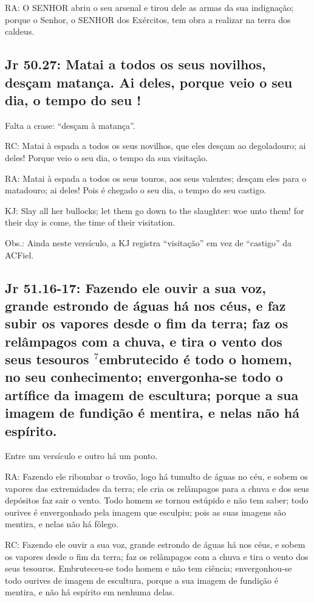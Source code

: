 RA: O SENHOR abriu o seu arsenal e tirou dele as armas da sua indignação; porque o Senhor, o SENHOR dos Exércitos, tem obra a realizar na terra dos caldeus.

\subsection{Jr 50.27: Matai a todos os seus novilhos, desçam  matança. Ai deles, porque veio o seu dia, o tempo do seu !}

Falta a crase: ``desçam à matança''.

RC: Matai à espada a todos os seus novilhos, que eles desçam ao degoladouro; ai deles! Porque veio o seu dia, o tempo da sua visitação.

RA: Matai à espada a todos os seus touros, aos seus valentes; desçam eles para o matadouro; ai deles! Pois é chegado o seu dia, o tempo do seu castigo.

KJ: Slay all her bullocks; let them go down to the slaughter: woe unto them! for their day is come, the time of their visitation.

Obs.: Ainda neste versículo, a KJ registra ``visitação''  em vez de ``castigo'' da ACFiel.

\subsection{Jr 51.16-17: Fazendo ele ouvir a sua voz, grande estrondo de águas há nos céus, e faz subir os vapores desde o fim da terra; faz os relâmpagos com a chuva, e tira o vento dos seus tesouros\uwave{,} $^{\mathrm{7}}$embrutecido é todo o homem, no seu conhecimento; envergonha-se todo o artífice da imagem de escultura; porque a sua imagem de fundição é mentira, e nelas não há espírito.}

Entre um versículo e outro há um ponto.

RA: Fazendo ele ribombar o trovão, logo há tumulto de águas no céu, e sobem os vapores das extremidades da terra; ele cria os relâmpagos para a chuva e dos seus depósitos faz sair o vento. Todo homem se tornou estúpido e não tem saber; todo ourives é envergonhado pela imagem que esculpiu; pois as suas imagens são mentira, e nelas não há fôlego.

RC: Fazendo ele ouvir a sua voz, grande estrondo de águas há nos céus, e sobem os vapores desde o fim da terra; faz os relâmpagos com a chuva e tira o vento dos seus tesouros. Embruteceu-se todo homem e não tem ciência; envergonhou-se todo ourives de imagem de escultura, porque a sua imagem de fundição é mentira, e não há espírito em nenhuma delas.


